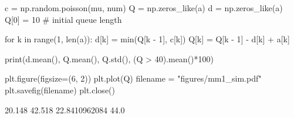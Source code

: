 
c = np.random.poisson(mu, num)
Q = np.zeros_like(a)
d = np.zeros_like(a)
Q[0] = 10  # initial queue length

for k in range(1, len(a)):
    d[k] = min(Q[k - 1], c[k])
    Q[k] = Q[k - 1] - d[k] + a[k]

print(d.mean(), Q.mean(), Q.std(), (Q > 40).mean()*100)

plt.figure(figsize=(6, 2))
plt.plot(Q)
filename = "figures/mm1_sim.pdf"
plt.savefig(filename)
plt.close()

20.148 42.518 22.8410962084 44.0

